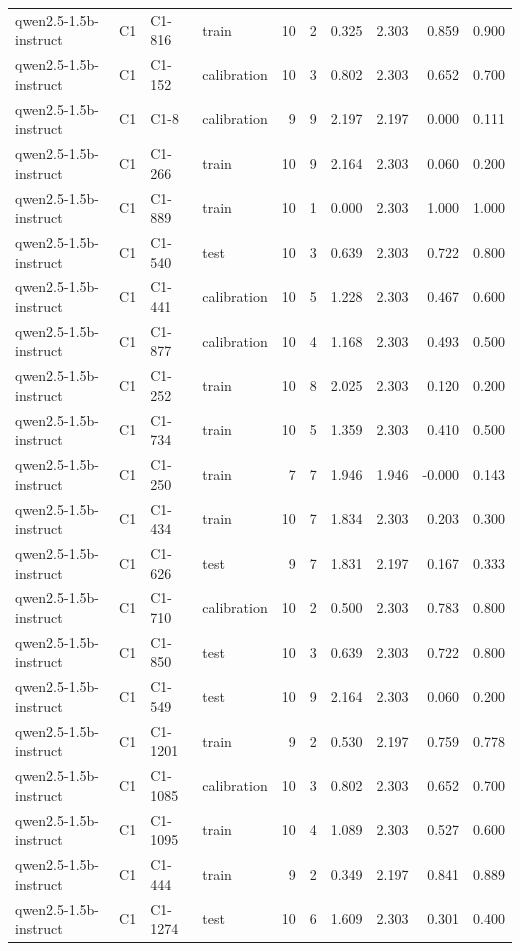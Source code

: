 \begin{table}
\begin{tabular}{llllrrrrrr}
qwen2.5-1.5b-instruct & C1 & C1-816 & train & 10 & 2 & 0.325 & 2.303 & 0.859 & 0.900 \\
qwen2.5-1.5b-instruct & C1 & C1-152 & calibration & 10 & 3 & 0.802 & 2.303 & 0.652 & 0.700 \\
qwen2.5-1.5b-instruct & C1 & C1-8 & calibration & 9 & 9 & 2.197 & 2.197 & 0.000 & 0.111 \\
qwen2.5-1.5b-instruct & C1 & C1-266 & train & 10 & 9 & 2.164 & 2.303 & 0.060 & 0.200 \\
qwen2.5-1.5b-instruct & C1 & C1-889 & train & 10 & 1 & 0.000 & 2.303 & 1.000 & 1.000 \\
qwen2.5-1.5b-instruct & C1 & C1-540 & test & 10 & 3 & 0.639 & 2.303 & 0.722 & 0.800 \\
qwen2.5-1.5b-instruct & C1 & C1-441 & calibration & 10 & 5 & 1.228 & 2.303 & 0.467 & 0.600 \\
qwen2.5-1.5b-instruct & C1 & C1-877 & calibration & 10 & 4 & 1.168 & 2.303 & 0.493 & 0.500 \\
qwen2.5-1.5b-instruct & C1 & C1-252 & train & 10 & 8 & 2.025 & 2.303 & 0.120 & 0.200 \\
qwen2.5-1.5b-instruct & C1 & C1-734 & train & 10 & 5 & 1.359 & 2.303 & 0.410 & 0.500 \\
qwen2.5-1.5b-instruct & C1 & C1-250 & train & 7 & 7 & 1.946 & 1.946 & -0.000 & 0.143 \\
qwen2.5-1.5b-instruct & C1 & C1-434 & train & 10 & 7 & 1.834 & 2.303 & 0.203 & 0.300 \\
qwen2.5-1.5b-instruct & C1 & C1-626 & test & 9 & 7 & 1.831 & 2.197 & 0.167 & 0.333 \\
qwen2.5-1.5b-instruct & C1 & C1-710 & calibration & 10 & 2 & 0.500 & 2.303 & 0.783 & 0.800 \\
qwen2.5-1.5b-instruct & C1 & C1-850 & test & 10 & 3 & 0.639 & 2.303 & 0.722 & 0.800 \\
qwen2.5-1.5b-instruct & C1 & C1-549 & test & 10 & 9 & 2.164 & 2.303 & 0.060 & 0.200 \\
qwen2.5-1.5b-instruct & C1 & C1-1201 & train & 9 & 2 & 0.530 & 2.197 & 0.759 & 0.778 \\
qwen2.5-1.5b-instruct & C1 & C1-1085 & calibration & 10 & 3 & 0.802 & 2.303 & 0.652 & 0.700 \\
qwen2.5-1.5b-instruct & C1 & C1-1095 & train & 10 & 4 & 1.089 & 2.303 & 0.527 & 0.600 \\
qwen2.5-1.5b-instruct & C1 & C1-444 & train & 9 & 2 & 0.349 & 2.197 & 0.841 & 0.889 \\
qwen2.5-1.5b-instruct & C1 & C1-1274 & test & 10 & 6 & 1.609 & 2.303 & 0.301 & 0.400 \\

\end{tabular}
\end{table}
